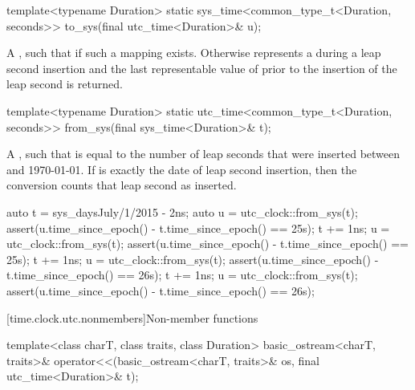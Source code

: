%
\begin{itemdecl}
template<typename Duration>
  static sys_time<common_type_t<Duration, seconds>>
    to_sys(final utc_time<Duration>& u);
\end{itemdecl}

\begin{itemdescr}
\pnum
\returns
A  ,
such that  if such a mapping exists.
Otherwise  represents a 
during a leap second insertion
and the last representable value of 
prior to the insertion of the leap second is returned.
\end{itemdescr}

%
\begin{itemdecl}
template<typename Duration>
  static utc_time<common_type_t<Duration, seconds>>
    from_sys(final sys_time<Duration>& t);
\end{itemdecl}

\begin{itemdescr}
\pnum
\returns
A  , such that
is equal to the number of leap seconds that were inserted
between  and 1970-01-01.
If  is exactly the date of leap second insertion,
then the conversion counts that leap second as inserted.

\begin{example}
\begin{codeblock}
auto t = sys_days{July/1/2015} - 2ns;
auto u = utc_clock::from_sys(t);
assert(u.time_since_epoch() - t.time_since_epoch() == 25s);
t += 1ns;
u = utc_clock::from_sys(t);
assert(u.time_since_epoch() - t.time_since_epoch() == 25s);
t += 1ns;
u = utc_clock::from_sys(t);
assert(u.time_since_epoch() - t.time_since_epoch() == 26s);
t += 1ns;
u = utc_clock::from_sys(t);
assert(u.time_since_epoch() - t.time_since_epoch() == 26s);
\end{codeblock}
\end{example}
\end{itemdescr}

[time.clock.utc.nonmembers]{Non-member functions}

%
\begin{itemdecl}
template<class charT, class traits, class Duration>
  basic_ostream<charT, traits>&
    operator<<(basic_ostream<charT, traits>& os, final utc_time<Duration>& t);
\end{itemdecl}

